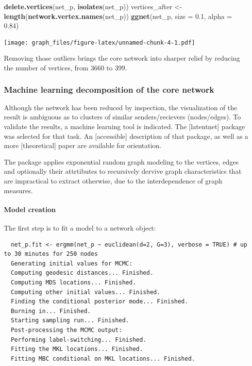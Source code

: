 \documentclass[]{article}
\newenvironment{Shaded}{\begin{snugshade}}{\end{snugshade}}
\newcommand{\DataTypeTok}[1]{\textcolor[rgb]{0.13,0.29,0.53}{#1}}
\newcommand{\FloatTok}[1]{\textcolor[rgb]{0.00,0.00,0.81}{#1}}
\newcommand{\KeywordTok}[1]{\textcolor[rgb]{0.13,0.29,0.53}{\textbf{#1}}}
\newcommand{\NormalTok}[1]{#1}
\newcommand{\StringTok}[1]{\textcolor[rgb]{0.31,0.60,0.02}{#1}}
\let\oldparagraph\paragraph
\renewcommand{\paragraph}[1]{\oldparagraph{#1}\mbox{}}
\begin{document}
\begin{Shaded}
\begin{Highlighting}[]
\KeywordTok{delete.vertices}\NormalTok{(net_p, }\KeywordTok{isolates}\NormalTok{(net_p))}
\NormalTok{vertices_after <-}\StringTok{ }\KeywordTok{length}\NormalTok{(}\KeywordTok{network.vertex.names}\NormalTok{(net_p))}
\KeywordTok{ggnet}\NormalTok{(net_p, }\DataTypeTok{size =} \FloatTok{0.1}\NormalTok{, }\DataTypeTok{alpha =} \FloatTok{0.84}\NormalTok{)}
\end{Highlighting}
\end{Shaded}

\texttt{[image: graph\_files/figure-latex/unnamed-chunk-4-1.pdf]}

Removing those outliers brings the core network into sharper relief by
reducing the number of vertices, from 3660 to 399.

\hypertarget{machine-learning-decomposition-of-the-core-network}{%
\subsubsection{Machine learning decomposition of the core
network}\label{machine-learning-decomposition-of-the-core-network}}

Although the network has been reduced by inspection, the visualization
of the result is ambiguous as to clusters of similar senders/recievers
(nodes/edges). To validate the results, a machine learning tool is
indicated. The {[}latentnet{]} package was selected for that task. An
{[}accessible{]} description of that package, as well as a more
{[}theoretical{]} paper are available for orientation.

The package applies exponential random graph modeling to the vertices,
edges and optionally their attrtibutes to recursively dervive graph
characteristics that are impractical to extract otherwise, due to the
interdependence of graph measures.

\hypertarget{model-creation}{%
\paragraph{Model creation}\label{model-creation}}

The first step is to fit a model to a network object:

\begin{verbatim}
  net_p.fit <- ergmm(net_p ~ euclidean(d=2, G=3), verbose = TRUE) # up to 30 minutes for 250 nodes
  Generating initial values for MCMC:
  Computing geodesic distances... Finished.
  Computing MDS locations... Finished.
  Computing other initial values... Finished.
  Finding the conditional posterior mode... Finished.
  Burning in... Finished.
  Starting sampling run... Finished.
  Post-processing the MCMC output:
  Performing label-switching... Finished.
  Fitting the MKL locations... Finished.
  Fitting MBC conditional on MKL locations... Finished.
\end{verbatim}
\end{document}
